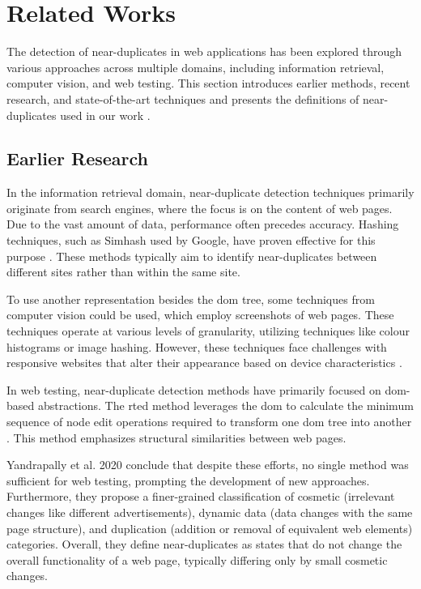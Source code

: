 \section{Related Works}

    The detection of near-duplicates in web applications has been explored through various approaches across multiple domains, including information retrieval, computer vision, and web testing. This section introduces earlier methods, recent research, and state-of-the-art techniques and presents the definitions of near-duplicates used in our work \cite{yandrapally_near-duplicate_2020}. 

    \subsection{Earlier Research}
     
        In the information retrieval domain, near-duplicate detection techniques primarily originate from search engines, where the focus is on the content of web pages. Due to the vast amount of data, performance often precedes accuracy. Hashing techniques, such as Simhash used by Google, have proven effective for this purpose \cite{charikar_similarity_2002}. These methods typically aim to identify near-duplicates between different sites rather than within the same site.
        
        To use another representation besides the \ac{dom} tree, some techniques from computer vision could be used, which employ screenshots of web pages. These techniques operate at various levels of granularity, utilizing techniques like colour histograms or image hashing. However, these techniques face challenges with responsive websites that alter their appearance based on device characteristics \cite{swain_indexing_1992,yang_block_2006}. 
        
        In web testing, near-duplicate detection methods have primarily focused on \ac{dom}-based abstractions. The \ac{rted} method leverages the \ac{dom} to calculate the minimum sequence of node edit operations required to transform one \ac{dom} tree into another \cite{pawlik_efficient_2015}. This method emphasizes structural similarities between web pages.
        
        Yandrapally et al. 2020 \cite{yandrapally_near-duplicate_2020} conclude that despite these efforts, no single method was sufficient for web testing, prompting the development of new approaches. Furthermore, they propose a finer-grained classification of cosmetic (irrelevant changes like different advertisements), dynamic data (data changes with the same page structure), and duplication (addition or removal of equivalent web elements) categories. Overall, they define near-duplicates as states that do not change the overall functionality of a web page, typically differing only by small cosmetic changes.

